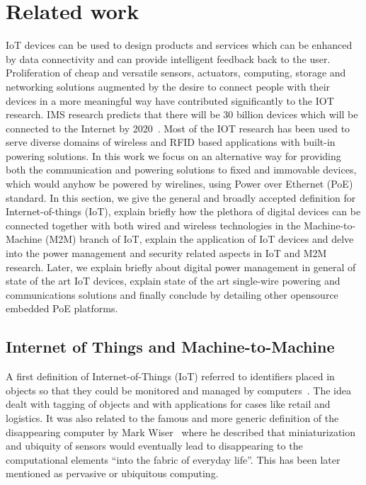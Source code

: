 \documentclass[final]{siamltex}
\begin{document}
\section{Related work}
\label{sec:related}

IoT devices can be used to design products and services which can be enhanced by
data connectivity and can provide intelligent feedback back to the user.
Proliferation of cheap and versatile sensors, actuators, computing, storage and
networking solutions augmented by the desire to connect people with their
devices in a more meaningful way have contributed significantly to the IOT
research. IMS research predicts that there will be 30 billion devices which will
be connected to the Internet by 2020~\cite{ABIresearch}. Most of the IOT
research has been used to serve diverse domains of wireless and RFID based
applications with built-in powering solutions. In this work we focus on an
alternative way for providing both the communication and powering solutions to
fixed and immovable devices, which would anyhow be powered by wirelines, using
Power over Ethernet (PoE) standard. In this section, we give the general and
broadly accepted definition for Internet-of-things (IoT), explain briefly how
the plethora of digital devices can be connected together with both wired and
wireless technologies in the Machine-to-Machine (M2M) branch of IoT, explain the
application of IoT devices and delve into the power management and security
related aspects in IoT and M2M research. Later, we explain briefly about digital
power management in general of state of the art IoT devices, explain state of
the art single-wire powering and communications solutions and finally conclude
by detailing other opensource embedded PoE platforms.


\subsection{Internet of Things and Machine-to-Machine}

A first definition of Internet-of-Things (IoT) referred to identifiers
placed in objects so that they could be monitored and managed by
computers~\cite{ashton2009internet}. The idea dealt with tagging of
objects and with applications for cases like retail and logistics. It
was also related to the famous and more generic definition of the
disappearing computer by Mark Wiser~\cite{weiser1991computer} where he
described that miniaturization and ubiquity of sensors would
eventually lead to disappearing to the computational elements ``into
the fabric of everyday life''.  This has been later mentioned as
pervasive or ubiquitous computing.
\end{document}
